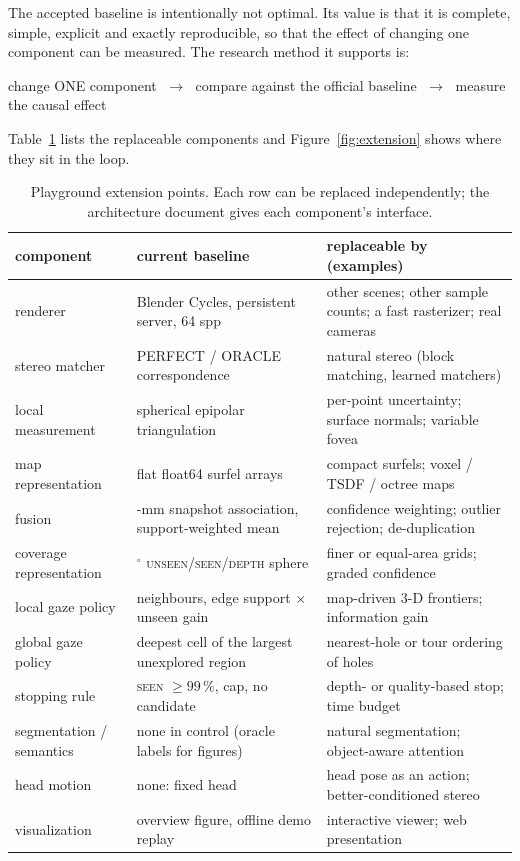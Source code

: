 \documentclass[11pt,a4paper]{article}
\newcommand{\pct}[1]{#1\,\%}
\newcommand{\degr}{\ensuremath{^\circ}}
\begin{document}
The accepted baseline is intentionally not optimal. Its value is that it is complete, simple, explicit and exactly
reproducible, so that the effect of changing one component can be measured. The research method it supports is:
\begin{center}
\sffamily change ONE component $\;\rightarrow\;$ compare against the official baseline $\;\rightarrow\;$ measure the
causal effect
\end{center}
Table~\ref{tab:extension} lists the replaceable components and Figure~\ref{fig:extension} shows where they sit in the
loop.

\begin{table}[h]
\centering\small
\caption{Playground extension points. Each row can be replaced independently; the architecture document gives each
component's interface.}
\label{tab:extension}
\begin{tabularx}{\linewidth}{@{}l >{\raggedright\arraybackslash}X >{\raggedright\arraybackslash}X@{}}
\toprule
component & current baseline & replaceable by (examples) \\
\midrule
renderer & Blender Cycles, persistent server, 64 spp & other scenes; other sample counts; a fast rasterizer; real cameras \\
stereo matcher & PERFECT / ORACLE correspondence & natural stereo (block matching, learned matchers) \\
local measurement & spherical epipolar triangulation & per-point uncertainty; surface normals; variable fovea \\
map representation & flat float64 surfel arrays & compact surfels; voxel / TSDF / octree maps \\
fusion & 12-mm snapshot association, support-weighted mean & confidence weighting; outlier rejection; de-duplication \\
coverage representation & 1\degr{} \textsc{unseen}/\textsc{seen}/\textsc{depth} sphere & finer or equal-area grids;
  graded confidence \\
local gaze policy & 8 neighbours, edge support $\times$ unseen gain & map-driven 3-D frontiers; information gain \\
global gaze policy & deepest cell of the largest unexplored region & nearest-hole or tour ordering of holes \\
stopping rule & \textsc{seen} $\ge \pct{99}$, cap, no candidate & depth- or quality-based stop; time budget \\
segmentation / semantics & none in control (oracle labels for figures) & natural segmentation; object-aware attention \\
head motion & none: fixed head & head pose as an action; better-conditioned stereo \\
visualization & overview figure, offline demo replay & interactive viewer; web presentation \\
\bottomrule
\end{tabularx}
\end{table}
\end{document}
